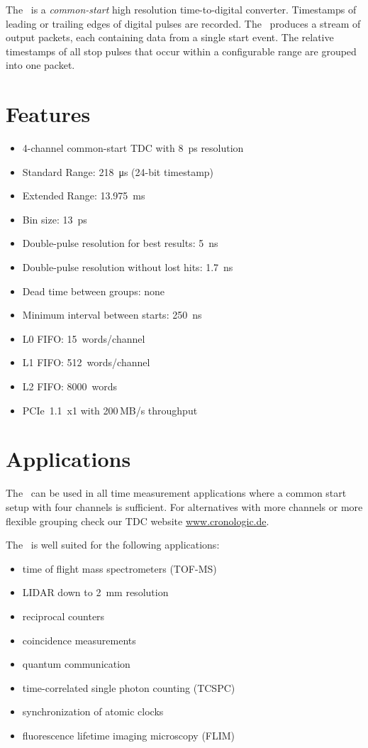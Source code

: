 The \deviceName\ is a \emph{common-start} high resolution time-to-digital converter. 
Timestamps of leading or trailing edges of digital pulses are recorded. 
The \deviceName\ produces a stream of output packets, each containing data from a single start event. 
The relative timestamps of all stop pulses that occur within a configurable range are grouped into one packet.

\section{Features}
	\begin{itemize}
		\item 4-channel common-start TDC with 8~ps resolution
		\item Standard Range: \SI{218}{\micro\second} (24-bit timestamp)
		\item Extended Range: \SI{13.975}{\milli\second}
		\item Bin size: \SI{13}{\pico\second}
		\item Double-pulse resolution for best results: \SI{5}{\nano\second}
		\item Double-pulse resolution without lost hits: \SI{1.7}{\nano\second}
		\item Dead time between groups: none
		\item Minimum interval between starts: \SI{250}{\nano\second}
		\item L0 FIFO: 15~words/channel
		\item L1 FIFO: 512~words/channel
		\item L2 FIFO: 8000~words
		\item PCIe~1.1~x1 with 200\,MB/s throughput
	\end{itemize} 
\section{Applications}
The \deviceName\ can be used in all time measurement applications where a common start setup with four channels is sufficient. 
For alternatives with more channels or more flexible grouping check our TDC website \href{https://www.cronologic.de/produkte/products-overview#tdcdata}{www.cronologic.de}.

The \deviceName\ is well suited for the following applications:
\begin{itemize}
	\item time of flight mass spectrometers (TOF-MS)
	\item LIDAR down to \SI{2}{\milli\meter} resolution
	\item reciprocal counters
	\item coincidence measurements
	\item quantum communication
	\item time-correlated single photon counting (TCSPC)
	\item synchronization of atomic clocks
	\item fluorescence lifetime imaging microscopy (FLIM)
\end{itemize} 